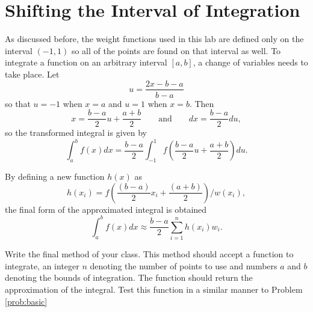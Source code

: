 \section*{Shifting the Interval of Integration} %

As discussed before, the weight functions used in this lab are defined only on the interval $(-1,1)$ so all of the points are found on that interval as well.
To integrate a function on an arbitrary interval $[a,b]$, a change of variables needs to take place.
Let \[u = \frac{2x - b - a}{b - a}\] so that $u = -1$ when $x = a$ and $u = 1$ when $x=b$.
Then 
\[
x = \frac{b - a}{2}u + \frac{a + b}{2}\qquad \text{and}\qquad dx = \frac{b - a}{2}du,
\] 
so the transformed integral is given by
\[
\int_a^b f(x) dx = \frac{b-a}{2}\int_{-1}^1 f\left(\frac{b-a}{2}u + \frac{a+b}{2}\right)du.
\]

\begin{comment}
The general quadrature formula is then given by the following equation.
\[
\int_a^b f(x) dx \approx \frac{b - a}{2} \sum_i w_i f\left(\frac{(b-a)}{2}x_i + \frac{(a+b)}{2}\right)
\]
\end{comment}

By defining a new function $h(x)$ as
\[
h(x_i) = f\left(\frac{(b-a)}{2}x_i + \frac{(a+b)}{2}\right) / w(x_i),
\]
the final form of the approximated integral is obtained
\[
\int_{a}^{b} f(x) dx \approx \frac{b-a}{2} \sum_{i=1}^n h(x_i)w_i .
\]

\begin{problem} %
Write the final method of your class.
This method should accept a function  to integrate, an integer $n$ denoting the number of points to use and numbers $a$ and $b$ denoting the bounds of integration.
The function should return the approximation of the integral.
Test this function in a similar manner to Problem \ref{prob:basic}
\end{problem}

\begin{comment} %
As an example, let $f(x) = x^2$ on $[1,4]$.
We know that $\left.\int_1^4 x^2 dx = \frac{x^3}{3}\right|_1^4 = 21$.
Then setting
\begin{align*}
g(x) &= \frac{b - a}{2}f\left(\frac{b-a}{2}x + \frac{b+a}{2}\right) \\
& = \frac{3}{2}\left(\frac{3}{2}x + \frac{5}{2}\right)^2 \\
&= \frac{27}{8}x^2 + \frac{45}{8}x + \frac{75}{8},
\end{align*}
the interval-adjusted integral of $f(x)$ is given by
\begin{align*}
\int_a^b f(x)dx = \int_{-1}^1 g(x)dx = \left.\frac{9}{8} x^3 + \frac{45}{4} x^2 + \frac{75}{8} x\right|_{-1}^1 = 21.
\end{align*}
\end{comment}


